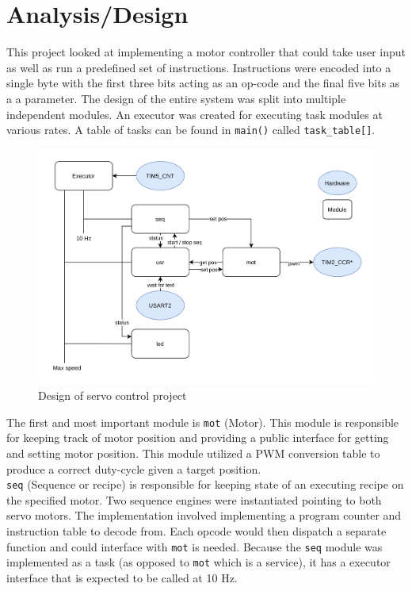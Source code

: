 \documentclass[CMPE]{KGCOEReport}
\def\code#1{\texttt{#1}}
\begin{document}
    \maketitle
    \section*{Analysis/Design}

    This project looked at implementing a motor controller that could take
    user input as well as run a predefined set of instructions. Instructions
    were encoded into a single byte with the first three bits acting as an
    op-code and the final five bits as a a parameter. The design of the entire
    system was split into multiple independent modules. An executor was created
    for executing task modules at various rates. A table of tasks can be found
    in \code{main()} called \code{task\_table[]}. \\
    
    \begin{figure}[h!]
      \centering
      \includegraphics[width=5.5in]{servo_proj_design}
      \caption{Design of servo control project}
      \label{fig:overview}
    \end{figure}
    
    The first and most
    important module is \code{mot} (Motor). This module is responsible for
    keeping track of motor position and providing a public interface for
    getting and setting motor position. This module utilized a PWM conversion
    table to produce a correct duty-cycle given a target position.\\

    \code{seq} (Sequence or recipe) is responsible for keeping state of an
    executing recipe on the specified motor. Two sequence engines were
    instantiated pointing to both servo motors. The implementation involved
    implementing a program counter and instruction table to decode from.
    Each opcode would then dispatch a separate function and could interface
    with \code{mot} is needed. Because the \code{seq} module was implemented
    as a task (as opposed to \code{mot} which is a service), it has a executor
    interface that is expected to be called at 10 Hz.\\
\end{document}
